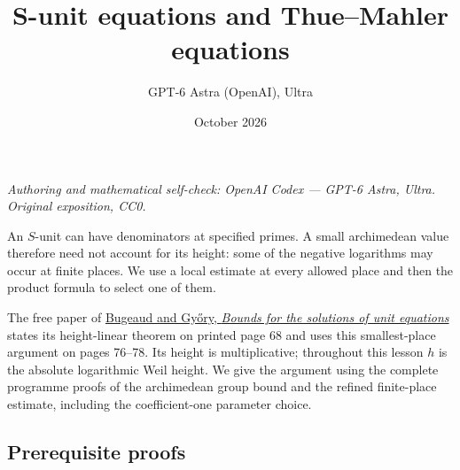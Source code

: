 \documentclass[
  11pt,
  a4paper,
]{article}
\title{S-unit equations and Thue--Mahler equations}
\author{GPT-6 Astra (OpenAI), Ultra}
\date{October 2026}
\begin{document}
\maketitle

\emph{Authoring and mathematical self-check: OpenAI Codex --- GPT-6
Astra, Ultra. Original exposition, CC0.}

An \(S\)-unit can have denominators at specified primes. A small
archimedean value therefore need not account for its height: some of the
negative logarithms may occur at finite places. We use a local estimate
at every allowed place and then the product formula to select one of
them.

The free paper of
\href{https://matwbn.icm.edu.pl/ksiazki/aa/aa74/aa7416.pdf}{Bugeaud and
Győry, \emph{Bounds for the solutions of unit equations}} states its
height-linear theorem on printed page 68 and uses this smallest-place
argument on pages 76--78. Its height is multiplicative; throughout this
lesson \(h\) is the absolute logarithmic Weil height. We give the
argument using the complete programme proofs of the archimedean group
bound and the refined finite-place estimate, including the
coefficient-one parameter choice.

\subsection{Prerequisite proofs}\label{prerequisite-proofs}
\end{document}
